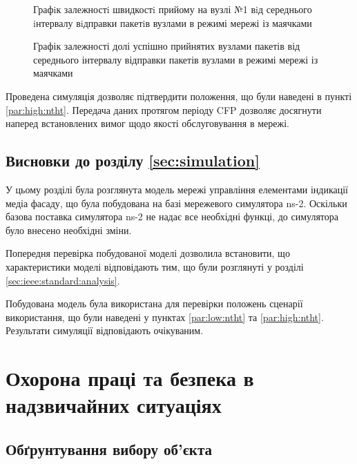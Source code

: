 \documentclass[a4paper,ukrainian,utf8,nocolumnsxix,floatsection,equationsection]{eskdtext}
\let\stdsection\section
\renewcommand\section{\clearpage\stdsection}
\begin{document}
\begin{figure}[h]
	\centering
	\caption{\label{fig:result_test_backtraf_beac_brd_tp1}Графiк залежностi швидкостi прийому на вузлі №1 вiд середнього iнтервалу вiдправки пакетiв вузлами в режимі мережі із маячками}
\end{figure}

\begin{figure}[h]
	\centering
	\caption{\label{fig:result_test_backtraf_beac_brd_deliv}Графік залежності долі успішно прийнятих вузлами пакетів від середнього інтервалу відправки пакетів вузлами в режимі мережі із маячками}
\end{figure}


Проведена симуляція дозволяє підтвердити положення, що були наведені в пункті \ref{par:high:ntht}. Передача даних протягом періоду CFP дозволяє досягнути наперед встановлених вимог щодо якості обслуговування в мережі. 

\subsection{Висновки до розділу \ref{sec:simulation}}

У цьому розділі була розглянута модель мережі управління елементами індикації медіа фасаду, що була побудована на базі мережевого симулятора ns-2. Оскільки базова поставка симулятора ns-2 не надає все необхідні функці, до симулятора було внесено необхідні зміни.

Попередня перевірка побудованої моделі дозволила встановити, що характеристики моделі відповідають тим, що були розглянуті у розділі \ref{sec:ieee:standard:analysis}. 

Побудована модель була використана для перевірки положень сценарії використання, що були наведені у пунктах \ref{par:low:ntht} та \ref{par:high:ntht}. Результати симуляції відповідають очікуваним. 


\section{Охорона праці та безпека в надзвичайних ситуаціях}
\label{sec:work_safety}

\subsection{Обґрунтування вибору об’єкта}
\end{document}
